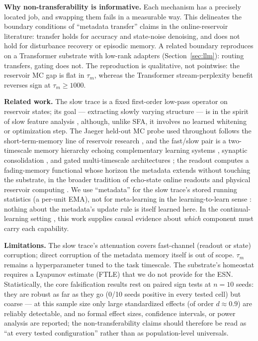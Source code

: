 \documentclass[preprint,12pt]{elsarticle}
\begin{document}
\textbf{Why non-transferability is informative.} Each mechanism has a
precisely located job, and swapping them fails in a measurable way. This
delineates the boundary conditions of ``metadata transfer'' claims in the
online-reservoir literature: transfer holds for accuracy and
state-noise denoising, and does not hold for disturbance recovery or
episodic memory. A related boundary reproduces on a Transformer substrate
with low-rank adapters (Section~\ref{sec:llm}): routing transfers,
gating does not. The reproduction is qualitative, not pointwise: the
reservoir MC gap is flat in $\tau_m$, whereas the Transformer
stream-perplexity benefit reverses sign at $\tau_m\ge1000$.

\textbf{Related work.} The slow trace is a fixed first-order low-pass
operator on reservoir states; its goal --- extracting slowly varying
structure --- is in the spirit of slow feature analysis \cite{wiskott2002},
although, unlike SFA, it involves no learned whitening or optimization
step. The Jaeger held-out MC probe used throughout follows the
short-term-memory line of reservoir research
\cite{jaeger2002mc,white2004,hermans2010,verstraeten2007}, and the
fast/slow pair is a two-timescale memory hierarchy echoing complementary
learning systems \cite{mcclelland1995}, synaptic consolidation
\cite{benna2016}, and gated multi-timescale architectures
\cite{hochreiter1997,pascanu2013}; the readout computes a fading-memory
functional \cite{boyd1985} whose horizon the metadata extends without
touching the substrate, in the broader tradition of echo-state online
readouts \cite{lukosevicius2012,yildiz2012,sussillo2009} and physical
reservoir computing \cite{appeltant2011,larger2012,tanaka2019}. We use
``metadata'' for the slow trace's stored running statistics (a per-unit
EMA), not for meta-learning in the learning-to-learn sense
\cite{thrun1998,finn2017,hospedales2022}: nothing about the metadata's
update rule is itself learned here. In the continual-learning setting
\cite{parisi2019,kirkpatrick2017,hadsell2020,wang2024cl,dohare2024,ke2023cpt},
this work supplies causal evidence about \emph{which} component must carry
each capability.

\textbf{Limitations.} The slow trace's attenuation covers fast-channel
(readout or state) corruption; direct corruption of the metadata memory
itself is out of scope. $\tau_m$ remains a hyperparameter tuned to the
task timescale. The substrate's homeostat requires a Lyapunov estimate
(FTLE) that we do not provide for the ESN. Statistically, the core
falsification results rest on paired sign tests at $n=10$ seeds: they
are robust as far as they go (0/10 seeds positive in every tested cell)
but coarse --- at this sample size only large standardized effects (of
order $d\approx0.9$) are reliably detectable, and no formal effect
sizes, confidence intervals, or power analysis are reported; the
non-transferability claims should therefore be read as ``at every
tested configuration'' rather than as population-level universals.
\end{document}
